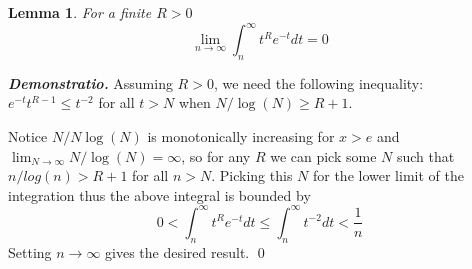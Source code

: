 \documentclass{article}
\newtheorem{lemma}{Lemma}
\theoremstyle{definition}
\theoremstyle{definition}
\theoremstyle{remark}
\renewenvironment{proof}{\vspace{0.4cm}\noindent\small{\emph{Demonstratio.}}}{\qed\vspace{0.4cm}}
\renewcommand{\emph}[1]{\textbf{\textit{#1}}}
\begin{document}
\begin{lemma}\label{lemma:1}
	For a finite $R > 0$ 
	\begin{equation}
		\lim_{n \rightarrow \infty}\int_{n}^{\infty} t^{R} e^{-t} dt = 0
	\end{equation}
\end{lemma}
\begin{proof}
	Assuming $R > 0$, we need the following inequality:
	$e^{-t} t^{R-1} \leq t^{-2}$ for all $t > N$ when $N/\log(N) \geq R + 1$.

	Notice $N / N\log(N)$ is monotonically increasing for $x > e$ and $\lim_{N \rightarrow \infty} N / \log(N) = \infty$, so for any $R$ we can pick some $N$ such that $n/log(n) > R+1$ for all $n > N$.
	Picking this $N$ for the lower limit of the integration thus the above integral is bounded by
	$$
	0 <  \int_{n}^{\infty} t^{R} e^{-t} dt \leq \int_{n}^{\infty} t^{-2} dt < \frac{1}{n}
	$$
	Setting $n \rightarrow \infty$ gives the desired result.
\end{proof}
\end{document}
